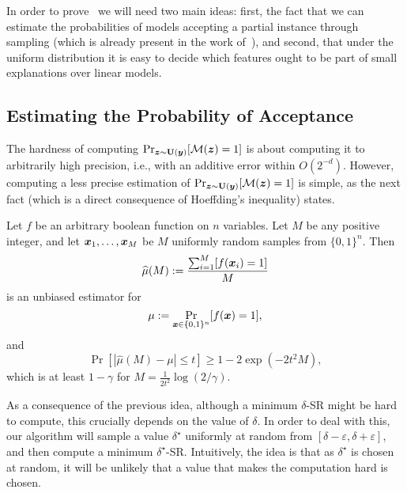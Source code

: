 

In order to prove~ we will need two main ideas: first, the fact that we can estimate the probabilities of models accepting a partial instance through sampling (which is already present in the work of~\citet{izza2024locallyminimalprobabilisticexplanations}), and second, that under the uniform distribution it is easy to decide which features ought to be part of small explanations over linear models.

\subsection{Estimating the Probability of Acceptance}
 The  hardness of computing
$\Pr_{{\bm{z}}  \sim \mathbf{U}({\bm{y}})}[\mathcal{M}({\bm{z}}) = 1]$ is about computing it to arbitrarily high precision, i.e., with an additive error within $O(2^{-d})$. However, computing a less precise estimation of $\Pr_{{\bm{z}} \sim \mathbf{U}({\bm{y}})}[\mathcal{M}({\bm{z}}) = 1]$ is simple, as the next fact (which is a direct consequence of Hoeffding's inequality)  states.

\begin{fact}\label{fact:hoeffding}
    Let $f$ be an arbitrary boolean function on $n$ variables. Let $M$ be any positive integer,
    and let ${\bm{x}}_1, \ldots, {\bm{x}}_M$ be $M$ uniformly random samples from $\{0, 1\}^n$. Then 
    \[
        \widehat{\mu}(M) := \frac{\sum_{i=1}^M [f({\bm{x}}_i) = 1]}{M}
    \]
    is an unbiased estimator for 
    \[
        \mu := \Pr_{{\bm{x}} \in \{0, 1\}^n}[f({\bm{x}}) = 1],
    \]
    and 
    \[
    \Pr[\left|\widehat{\mu}(M) - \mu \right| \leq t] \geq 1 - 2\exp(-2t^2 M),
    \]
    which is at least $1 - \gamma$ for $M = \frac{1}{2t^2} \log(2/\gamma)$.
\end{fact}

As a consequence of the previous idea, although a minimum $\delta$-SR might be hard to compute, this crucially depends on the value of $\delta$. In order to deal with this, our algorithm will sample a value $\delta^\star$ uniformly at random from $[\delta-\varepsilon, \delta+\varepsilon]$, and then compute a minimum $\delta^\star$-SR. Intuitively, the idea is that as $\delta^\star$ is chosen at random, it will be unlikely that a value that makes the computation hard is chosen. 

